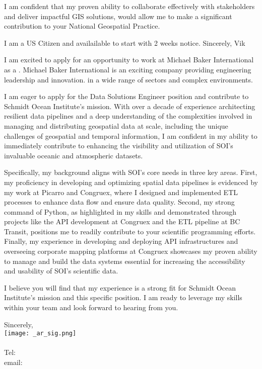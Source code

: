 \documentclass[letterpaper]{article}
\begin{document}
I am confident that my proven ability to
collaborate effectively with stakeholders and deliver impactful GIS solutions,
would allow me to make a significant contribution to your National Geospatial
Practice. 

I am a US Citizen and availailable to start with 2 weeks notice.
Sincerely, Vik

I am excited to apply for an opportunity to work at Michael Baker International as a \JobTitle.
Michael Baker International is an exciting company providing engineering leadership and innovation.
in a wide range of sectors and complex environments.

I am eager to apply for the Data Solutions Engineer position and contribute to Schmidt Ocean Institute's mission.
With over a decade of experience architecting resilient data pipelines and a deep understanding of the
complexities involved in managing and distributing geospatial data at scale,
including the unique challenges of geospatial and temporal information, I am confident in my ability to immediately contribute to enhancing the visibility
and utilization of SOI's invaluable oceanic and atmospheric datasets.

Specifically, my background aligns with SOI's core needs in three key areas.
First, my proficiency in developing and optimizing spatial data pipelines is evidenced by my work at Picarro and Congruex, where I designed and implemented
ETL processes to enhance data flow and ensure data quality.
Second, my strong command of Python, as highlighted in my skills and demonstrated through
projects like the API development at Congruex and the ETL pipeline at BC Transit, positions me to
readily contribute to your scientific programming
efforts.
Finally, my experience in developing and deploying API infrastructures and overseeing corporate mapping
platforms at Congruex showcases my proven ability to manage and build the data systems essential for increasing the
accessibility and usability of SOI’s scientific data.

I believe you will find that my experience is a strong fit for Schmidt Ocean
Institute’s mission and this specific position.
I am ready to leverage my skills within your team and look forward to hearing from you.

Sincerely,\\
    \hspace{1em}
    \texttt{[image: \_ar\_sig.png]} \\
    \CVsigname \\
    \small
    Tel: \CVphone \\
    email: \CVemail
\end{document}
